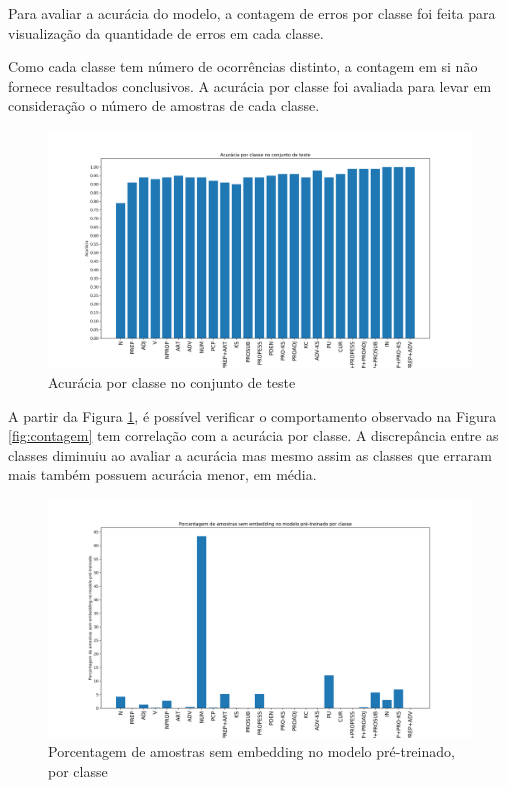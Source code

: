 \documentclass[11pt]{scrartcl} %
\begin{document}
Para avaliar a acurácia do modelo, a contagem de erros por classe foi feita para visualização da quantidade de erros em cada classe.

Como cada classe tem número de ocorrências distinto, a contagem em si não fornece resultados conclusivos. A acurácia por classe foi avaliada para levar em consideração o número de amostras de cada classe.

\begin{figure}[H] %
	\centering
	\includegraphics[width=1\columnwidth]{./Figures/acc_class.png} %
	\caption{Acurácia por classe no conjunto de teste}
	\label{fig:acc}
\end{figure}

A partir da Figura \ref{fig:acc}, é possível verificar o comportamento observado na Figura \ref{fig:contagem} tem correlação com a acurácia por classe. A discrepância entre as classes diminuiu ao avaliar a acurácia mas mesmo assim as classes que erraram mais também possuem acurácia menor, em média.


\begin{figure}[H] %
	\centering
	\includegraphics[width=1\columnwidth]{./Figures/perc_embedd.png} %
	\caption{Porcentagem de amostras sem embedding no modelo pré-treinado, por classe}
	\label{fig:embedd}
\end{figure}
\end{document}
